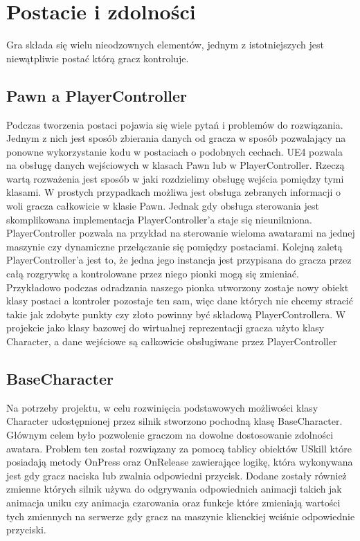 \documentclass[multip]{SGGW-thesis}
\begin{document}
\section{Postacie i zdolności}
	\label{characters-skills}
Gra składa się wielu nieodzownych elementów, jednym z istotniejszych jest niewątpliwie postać którą gracz kontroluje.
	\subsection{Pawn a PlayerController}
	Podczas tworzenia postaci pojawia się wiele pytań i problemów do rozwiązania.
Jednym z nich jest sposób zbierania danych od gracza w sposób pozwalający na ponowne wykorzystanie kodu w postaciach o podobnych cechach. UE4 pozwala na obsługę danych wejściowych w klasach Pawn lub w PlayerController. Rzeczą wartą rozważenia jest sposób w jaki rozdzielimy obsługę wejścia pomiędzy tymi klasami. W prostych przypadkach możliwa jest obsługa zebranych informacji o woli gracza całkowicie w klasie Pawn. Jednak gdy obsługa sterowania jest skomplikowana implementacja PlayerController’a staje się nieunikniona. PlayerController pozwala na przykład na sterowanie wieloma awatarami na jednej maszynie czy dynamiczne przełączanie się pomiędzy postaciami.  Kolejną zaletą PlayerController’a jest to, że jedna jego instancja jest przypisana do gracza przez całą rozgrywkę a kontrolowane przez niego pionki mogą się zmieniać. Przykładowo podczas odradzania naszego pionka utworzony zostaje nowy obiekt klasy postaci a kontroler pozostaje ten sam, więc dane których nie chcemy stracić takie jak zdobyte punkty czy złoto powinny być składową PlayerControllera.
	W projekcie jako klasy bazowej do wirtualnej reprezentacji gracza użyto klasy Character, a dane wejściowe są całkowicie obsługiwane przez PlayerController
	\subsection{BaseCharacter}
	Na potrzeby projektu, w celu rozwinięcia podstawowych możliwości klasy Character udostępnionej przez silnik stworzono pochodną klasę BaseCharacter. Głównym celem było pozwolenie graczom na dowolne dostosowanie zdolności awatara. Problem ten został rozwiązany za pomocą tablicy obiektów USkill które posiadają metody OnPress oraz OnRelease zawierające logikę, która wykonywana jest gdy gracz naciska lub zwalnia odpowiedni przycisk.		
	Dodane zostały również zmienne których silnik używa do odgrywania odpowiednich animacji takich jak animacja uniku czy animacja czarowania oraz funkcje które zmieniają wartości tych zmiennych na serwerze gdy gracz na maszynie klienckiej wciśnie odpowiednie przyciski.
\end{document}
